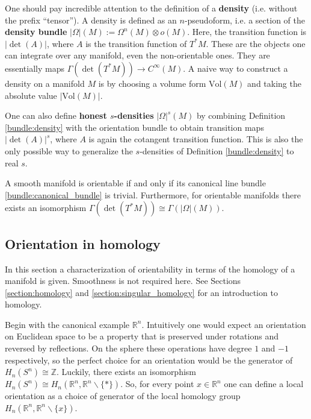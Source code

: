     \begin{remark}\label{bundle:honest_density}
        One should pay incredible attention to the definition of a \textbf{density} (i.e. without the prefix ``tensor''). A density is defined as an $n$-pseudoform, i.e. a section of the \textbf{density bundle} $|\Omega|(M):=\Omega^n(M)\otimes o(M)$. Here, the transition function is $|\det(A)|$, where $A$ is the transition function of $T^*M$. These are the objects one can integrate over any manifold, even the non-orientable ones. They are essentially maps $\Gamma(\det(T^*M))\rightarrow C^\infty(M)$. A naive way to construct a density on a manifold $M$ is by choosing a volume form $\mathrm{Vol}(M)$ and taking the absolute value $|\mathrm{Vol}(M)|$.

        One can also define \textbf{honest $s$-densities} $|\Omega|^s(M)$ by combining Definition \ref{bundle:density} with the orientation bundle to obtain transition maps $|\det(A)|^s$, where $A$ is again the cotangent transition function. This is also the only possible way to generalize the $s$-densities of Definition \ref{bundle:density} to real $s$.
    \end{remark}
    \begin{property}[Orientability]
        A smooth manifold is orientable if and only if its canonical line bundle \ref{bundle:canonical_bundle} is trivial. Furthermore, for orientable manifolds there exists an isomorphism $\Gamma(\det(T^*M))\cong\Gamma(|\Omega|(M))$.
    \end{property}

\subsection{Orientation in homology}

    In this section a characterization of orientability in terms of the homology of a manifold is given. Smoothness is not required here. See Sections \ref{section:homology} and \ref{section:singular_homology} for an introduction to homology.

    Begin with the canonical example $\mathbb{R}^n$. Intuitively one would expect an orientation on Euclidean space to be a property that is preserved under rotations and reversed by reflections. On the sphere these operations have degree $1$ and $-1$ respectively, so the perfect choice for an orientation would be the generator of $H_n(S^n)\cong\mathbb{Z}$. Luckily, there exists an isomorphism $H_n(S^n)\cong H_n(\mathbb{R}^n,\mathbb{R}^n\backslash\{\ast\})$. So, for every point $x\in\mathbb{R}^n$ one can define a local orientation as a choice of generator of the local homology group $H_n(\mathbb{R}^n,\mathbb{R}^n\backslash\{x\})$.

